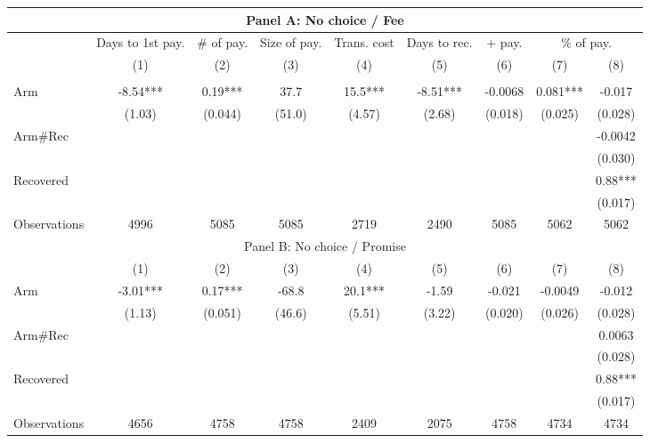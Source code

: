 \begin{tabular}{lcccccccc}
\toprule
\multicolumn{9}{c}{Panel A: No choice / Fee} \\
\midrule
\midrule
      & Days to 1st pay. & \# of pay. & Size of pay. & Trans. cost & Days to rec. & + pay. & \multicolumn{2}{c}{\% of pay.} \\
\midrule
      & (1)   & (2)   & (3)   & (4)   & (5)   & (6)   & (7)   & (8) \\
\midrule
\midrule
      &       &       &       &       &       &       &       &  \\
Arm   & -8.54*** & 0.19*** & 37.7  & 15.5*** & -8.51*** & -0.0068 & 0.081*** & -0.017 \\
      & (1.03) & (0.044) & (51.0) & (4.57) & (2.68) & (0.018) & (0.025) & (0.028) \\
Arm\#Rec &       &       &       &       &       &       &       & -0.0042 \\
      &       &       &       &       &       &       &       & (0.030) \\
Recovered &       &       &       &       &       &       &       & 0.88*** \\
      &       &       &       &       &       &       &       & (0.017) \\
\midrule
Observations & 4996  & 5085  & 5085  & 2719  & 2490  & 5085  & 5062  & 5062 \\
\midrule
\multicolumn{9}{c}{Panel B: No choice / Promise} \\
\midrule
\midrule
      & (1)   & (2)   & (3)   & (4)   & (5)   & (6)   & (7)   & (8) \\
\midrule
\midrule
Arm   & -3.01*** & 0.17*** & -68.8 & 20.1*** & -1.59 & -0.021 & -0.0049 & -0.012 \\
      & (1.13) & (0.051) & (46.6) & (5.51) & (3.22) & (0.020) & (0.026) & (0.028) \\
Arm\#Rec &       &       &       &       &       &       &       & 0.0063 \\
      &       &       &       &       &       &       &       & (0.028) \\
Recovered &       &       &       &       &       &       &       & 0.88*** \\
      &       &       &       &       &       &       &       & (0.017) \\
\midrule
Observations & 4656  & 4758  & 4758  & 2409  & 2075  & 4758  & 4734  & 4734 \\
\midrule

\end{tabular}
